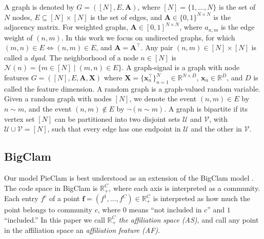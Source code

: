\documentclass{article}
\theoremstyle{plain}
\theoremstyle{definition}
\theoremstyle{remark}
\begin{document}
A graph is denoted by $G=([N],E,\mathbf{A})$, where $[N]=\{1,\ldots, N\}$ is the set of $N$ nodes,  $E\subseteq [N]\times[N]$ is the set of edges, and $\mathbf{A}\in \{0,1\}^{N\times N}$ is the adjacency matrix. For weighted graphs, $\mathbf{A}\in[0,1]^{N\times N}$, where $a_{n,m}$ is the edge weight of $(n,m)$.
In this work we focus on undirected graphs, for which $(m,n)\in E \Leftrightarrow (n,m)\in E$, and $\mathbf{A}=\mathbf{A}^{\top }$.  
%
Any pair $(n, m)\in [N]\times[N]$ is called a \emph{dyad}.
The neighborhood of a node $n\in[N]$ is  $\mathcal{N}(n)  = \{m \in [N] \mid (m,n) \in E\}$.
 A graph-signal is a graph with node features  $G=([N],E,\mathbf{A},\mathbf{X})$ where $\mathbf{X}=\{\mathbf{x}_n^{\top }\}_{n=1}^N\in \mathbb{R}^{N\times D}$, $\mathbf{x}_n\in\mathbb{R}^D$, and $D$ is called the feature dimension. 
A random graph is a graph-valued random variable. Given a random graph with nodes $[N]$, 
 we denote the event $(n,m)\in E$ by  $n\sim m$, and the event $(n,m)\notin E$ by $\neg (n\sim m)$.  
%
A graph is bipartite if its vertex set $[N]$ can be partitioned into two disjoint sets $\mathcal{U}$ and $\mathcal{V}$, with  $\mathcal{U}\cup\mathcal{V}=[N]$, such that every edge has one endpoint in $\mathcal{U}$ and the other in $\mathcal{V}$. 



\subsection{BigClam}
\label{sec:BigClam}

 Our model PieClam is best understood as an extension of the BigClam model \cite{Overlapping2012}. The code space in BigClam is $\mathbb{R}_+^C$, where each axis is interpreted as a community.  Each entry $f^c$ of a point $\mathbf{f}=(f^1,\ldots,f^C)\in\mathbb{R}_+^C$ is interpreted as how much the point belongs to community $c$, where $0$ means ``not included in $c$'' and $1$ ``included.'' In this paper we  call $\mathbb{R}_+^C$ \emph{the affiliation space (AS)}, and call any point in the affiliation space an \emph{affiliation feature (AF)}.
\end{document}
